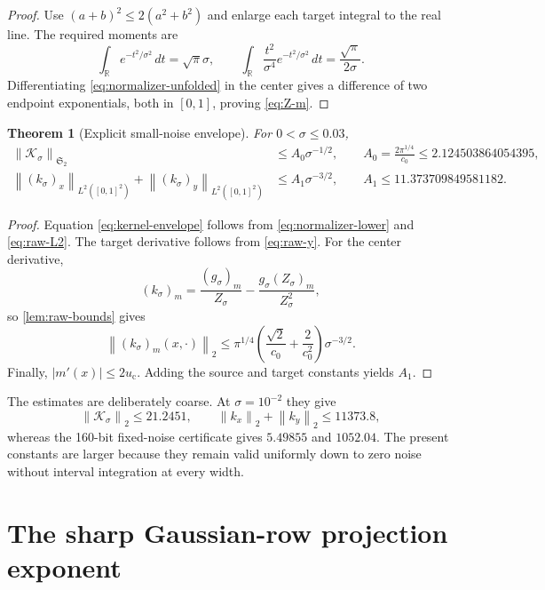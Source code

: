 \documentclass[11pt]{article}
\newtheorem{theorem}{Theorem}[section]
\theoremstyle{definition}
\theoremstyle{remark}
\newcommand{\R}{\mathbb R}
\newcommand{\cK}{\mathcal K}
\newcommand{\uc}{u_{\mathrm c}}
\newcommand{\norm}[1]{\left\lVert #1\right\rVert}
\begin{document}
\begin{proof}
Use $(a+b)^2\le2(a^2+b^2)$ and enlarge each target integral to the real
line.  The required moments are
\[
 \int_\R e^{-t^2/\sigma^2}\,dt=\sqrt\pi\sigma,
 \qquad
 \int_\R\frac{t^2}{\sigma^4}e^{-t^2/\sigma^2}\,dt
 =\frac{\sqrt\pi}{2\sigma}.
\]
Differentiating \eqref{eq:normalizer-unfolded} in the center gives a
difference of two endpoint exponentials, both in $[0,1]$, proving
\eqref{eq:Z-m}.
\end{proof}

\begin{theorem}[Explicit small-noise envelope]
\label{thm:envelope}
For $0<\sigma\le0.03$,
\begin{align}
 \norm{\cK_\sigma}_{\mathfrak S_2}
 &\le A_0\sigma^{-1/2},
 \qquad
 A_0=\frac{2\pi^{1/4}}{c_0}
 \le2.124503864054395,
 \label{eq:kernel-envelope}\\
 \norm{(k_\sigma)_x}_{L^2([0,1]^2)}
 +\norm{(k_\sigma)_y}_{L^2([0,1]^2)}
 &\le A_1\sigma^{-3/2},
 \qquad
 A_1\le11.373709849581182.
 \label{eq:first-envelope}
\end{align}
\end{theorem}

\begin{proof}
Equation \eqref{eq:kernel-envelope} follows from
\eqref{eq:normalizer-lower} and \eqref{eq:raw-L2}.  The target derivative follows from
\eqref{eq:raw-y}.  For the center derivative,
\begin{equation}
 (k_\sigma)_m
 =\frac{(g_\sigma)_m}{Z_\sigma}
 -\frac{g_\sigma(Z_\sigma)_m}{Z_\sigma^2},
 \label{eq:center-quotient}
\end{equation}
so \cref{lem:raw-bounds} gives
\begin{equation}
 \norm{(k_\sigma)_m(x,\cdot)}_2
 \le\pi^{1/4}
 \left(\frac{\sqrt2}{c_0}+\frac2{c_0^2}\right)
 \sigma^{-3/2}.
 \label{eq:center-bound}
\end{equation}
Finally, $|m'(x)|\le2\uc$.  Adding the source and target constants yields
$A_1$.
\end{proof}

The estimates are deliberately coarse.  At $\sigma=10^{-2}$ they give
\[
 \norm{\cK_\sigma}_2\le21.2451,
 \qquad
 \norm{k_x}_2+\norm{k_y}_2\le11373.8,
\]
whereas the 160-bit fixed-noise certificate gives $5.49855$ and
$1052.04$.  The present constants are larger because they remain valid
uniformly down to zero noise without interval integration at every width.

\section{The sharp Gaussian-row projection exponent}
\label{sec:sharp-row}
\end{document}
